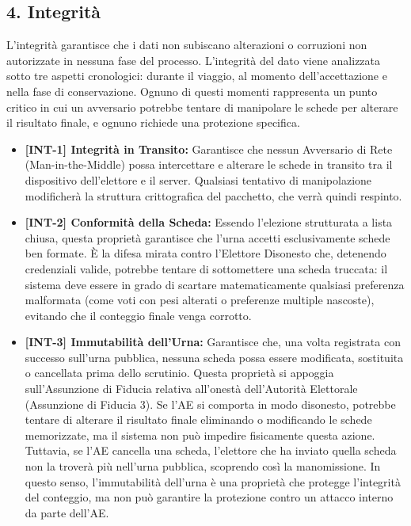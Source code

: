 \subsection*{4. Integrità}
L'integrità garantisce che i dati non subiscano alterazioni o corruzioni non autorizzate in nessuna fase del processo. L'integrità del dato viene analizzata sotto tre aspetti cronologici: durante il viaggio, al momento dell'accettazione e nella fase di conservazione. Ognuno di questi momenti rappresenta un punto critico in cui un avversario potrebbe tentare di manipolare le schede per alterare il risultato finale, e ognuno richiede una protezione specifica.

\begin{itemize}
    \item \textbf{[INT-1] Integrità in Transito:} Garantisce che nessun Avversario di Rete (Man-in-the-Middle) possa intercettare e alterare le schede in transito tra il dispositivo dell'elettore e il server. Qualsiasi tentativo di manipolazione modificherà la struttura crittografica del pacchetto, che verrà quindi respinto.
    \item \textbf{[INT-2] Conformità della Scheda:} Essendo l'elezione strutturata a lista chiusa, questa proprietà garantisce che l'urna accetti esclusivamente schede ben formate. È la difesa mirata contro l'Elettore Disonesto che, detenendo credenziali valide, potrebbe tentare di sottomettere una scheda truccata: il sistema deve essere in grado di scartare matematicamente qualsiasi preferenza malformata (come voti con pesi alterati o preferenze multiple nascoste), evitando che il conteggio finale venga corrotto.
    \item \textbf{[INT-3] Immutabilità dell'Urna:} Garantisce che, una volta registrata con successo sull'urna pubblica, nessuna scheda possa essere modificata, sostituita o cancellata prima dello scrutinio. Questa proprietà si appoggia sull'Assunzione di Fiducia relativa all'onestà dell'Autorità Elettorale (Assunzione di Fiducia 3). Se l'AE si comporta in modo disonesto, potrebbe tentare di alterare il risultato finale eliminando o modificando le schede memorizzate, ma il sistema non può impedire fisicamente questa azione. Tuttavia, se l'AE cancella una scheda, l'elettore che ha inviato quella scheda non la troverà più nell'urna pubblica, scoprendo così la manomissione. In questo senso, l'immutabilità dell'urna è una proprietà che protegge l'integrità del conteggio, ma non può garantire la protezione contro un attacco interno da parte dell'AE.
\end{itemize}

